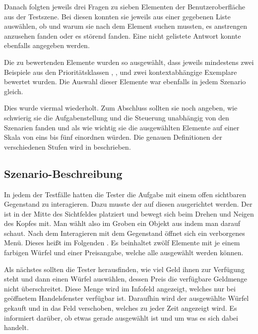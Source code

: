 			
			Danach folgten jeweils drei Fragen zu sieben Elementen der Benutzeroberfläche aus der Testszene. Bei diesen konnten sie jeweils aus einer gegebenen Liste auswählen, ob und warum sie nach dem Element suchen mussten, es anstrengen anzusehen fanden oder es störend fanden. Eine nicht gelistete Antwort konnte ebenfalls angegeben werden.
			
			Die zu bewertenden Elemente wurden so ausgewählt, dass jeweils mindestens zwei Beispiele aus den Prioritätsklassen , ,  und zwei kontextabhängige Exemplare bewertet wurden.
			Die Auswahl dieser Elemente war ebenfalls in jedem Szenario gleich.
			
			Dies wurde viermal wiederholt. Zum Abschluss sollten sie noch angeben, wie schwierig sie die Aufgabenstellung und die Steuerung unabhängig von den Szenarien fanden und als wie wichtig sie die ausgewählten Elemente auf einer Skala von eins bis fünf einordnen würden. Die genauen Definitionen der verschiedenen Stufen wird in  beschrieben.
		
		\subsection{Szenario-Beschreibung}\label{chapter:szenario}
			In jedem der Testfälle hatten die Tester die Aufgabe mit einem offen sichtbaren Gegenstand zu interagieren. Dazu musste der  auf diesen ausgerichtet werden. Der  ist in der Mitte des Sichtfeldes platziert und bewegt sich beim Drehen und Neigen des Kopfes mit. Man wählt also im Groben ein Objekt aus indem man darauf schaut.
			Nach dem Interagieren mit dem Gegenstand öffnet sich ein verborgenes Menü. Dieses heißt im Folgenden . Es beinhaltet zwölf Elemente mit je einem farbigen Würfel und einer Preisangabe, welche alle ausgewählt werden können.
			
			Als nächstes sollten die Tester herausfinden, wie viel Geld ihnen zur Verfügung steht und dann einen Würfel auswählen, dessen Preis die verfügbare Geldmenge nicht überschreitet. Diese Menge wird im Infofeld  angezeigt, welches nur bei geöffnetem Handelsfenster verfügbar ist.
			Daraufhin wird der ausgewählte Würfel gekauft und in das Feld  verschoben, welches zu jeder Zeit angezeigt wird. Es informiert darüber, ob etwas gerade ausgewählt ist und um was es sich dabei handelt.
			
